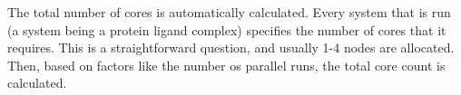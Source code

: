 








The total number of cores is automatically calculated. Every system that is
run (a system being a protein ligand complex) specifies the number of cores
that it requires. This is a straightforward question, and usually 1-4 nodes
are allocated. Then, based on factors like the number os parallel runs, the
total core count is calculated.

